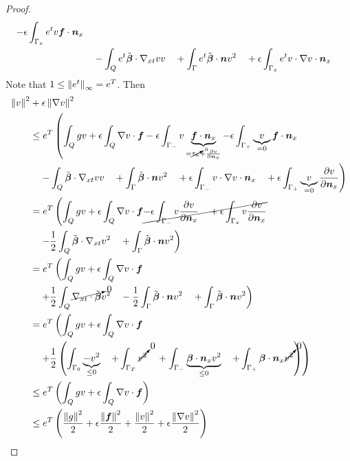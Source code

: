 \documentclass{article}
\begin{document}
\begin{proof}
\begin{align*}
-\epsilon\int_{\Gamma_x}e^{t}v\boldsymbol f\cdot\boldsymbol n_x\\
&\quad-\int_Qe^{t}\tilde{\boldsymbol\beta}\cdot\nabla_{xt} vv
\quad+\int_\Gamma e^{t}\tilde{\boldsymbol\beta}\cdot\boldsymbol n v^2
\quad+\epsilon\int_{\Gamma_x}e^{t}v\cdot\nabla v\cdot\boldsymbol n_x
\end{align*}
Note that $1\leq\left\| e^t \right\|_\infty=e^T$.
Then
\begin{align*}
\left\| v \right\|^2
&+\epsilon\left\| \nabla v \right\|^2
\\
&\leq
e^T\left(
\int_Qgv
+\epsilon\int_Q\nabla v\cdot\boldsymbol f
-\epsilon\int_{\Gamma_-}v\underbrace{\boldsymbol f\cdot\boldsymbol n_x}_{=\cancelto{0}{\tau_n}+\frac{\partial v}{\partial\boldsymbol n_x}}
-\epsilon\int_{\Gamma_+}\underbrace{v}_{=0}\boldsymbol f\cdot\boldsymbol n_x
\right.\\
&\left.
\quad-\int_Q\tilde{\boldsymbol\beta}\cdot\nabla_{xt} vv
\quad+\int_\Gamma \tilde{\boldsymbol\beta}\cdot\boldsymbol n v^2
\quad+\epsilon\int_{\Gamma_-}v\cdot\nabla v\cdot\boldsymbol n_x
\quad+\epsilon\int_{\Gamma_+}\underbrace{v}_{=0}\frac{\partial v}{\partial\boldsymbol n_x}
\right)
\\
&=
e^T\left(
\int_Qgv
+\epsilon\int_Q\nabla v\cdot\boldsymbol f
\cancel{
-\epsilon\int_{\Gamma_-}v\frac{\partial v}{\partial\boldsymbol n_x}
\quad+\epsilon\int_{\Gamma_x}v\frac{\partial v}{\partial\boldsymbol n_x}
}
\right.\\
&\left.
\quad-\frac{1}{2}\int_Q\tilde{\boldsymbol\beta}\cdot\nabla_{xt} v^2
\quad+\int_\Gamma \tilde{\boldsymbol\beta}\cdot\boldsymbol n v^2
\right)
\\
&=
e^T\left(
\int_Qgv
+\epsilon\int_Q\nabla v\cdot\boldsymbol f
\right.\\
&\left.
\quad+\frac{1}{2}\int_Q\cancelto{0}{\nabla_{xt}\cdot\tilde{\boldsymbol\beta}} v^2
\quad-\frac{1}{2}\int_\Gamma\tilde{\boldsymbol\beta}\cdot\boldsymbol n v^2
\quad+\int_\Gamma \tilde{\boldsymbol\beta}\cdot\boldsymbol n v^2
\right)
\\
&=
e^T\left(
\int_Qgv
+\epsilon\int_Q\nabla v\cdot\boldsymbol f
\right.\\
&\left.
\quad+\frac{1}{2}\left( \int_{\Gamma_0} \underbrace{-v^2}_{\leq 0}
\quad+\int_{\Gamma_T} \cancelto{0}{v^2}
\quad+\int_{\Gamma_-} \underbrace{\boldsymbol\beta\cdot\boldsymbol n_x v^2}_{\leq 0}
\quad+\int_{\Gamma_+} \boldsymbol\beta\cdot\boldsymbol n_x \cancelto{0}{v^2}
 \right)
\right)
\\
&\leq
e^T\left(
\int_Qgv
+\epsilon\int_Q\nabla v\cdot\boldsymbol f
\right)
\\
&\leq
e^T\left(
\frac{\left\| g \right\|^2}{2}
+\epsilon\frac{\left\| \boldsymbol f \right\|^2}{2}
+\frac{\left\| v \right\|^2}{2}
+\epsilon\frac{\left\| \nabla v \right\|^2}{2}
\right)
\end{align*}
\end{proof}
\end{document}
